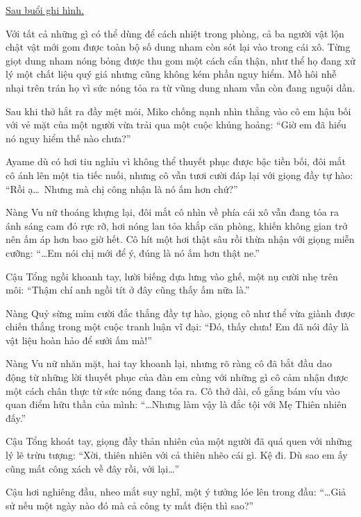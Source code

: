 \documentclass[../main.tex]{subfiles}
\begin{document}
\omk

\begin{center}
  \uline{Sau buổi ghi hình.}
\end{center}

Với tất cả những gì có thể dùng để cách nhiệt trong phòng, cả ba người vật lộn chật vật mới gom được toàn bộ số dung nham còn sót lại vào trong cái xô. Từng giọt dung nham nóng bỏng được thu gom một cách cẩn thận, như thể họ đang xử lý một chất liệu quý giá nhưng cũng không kém phần nguy hiểm. Mồ hôi nhễ nhại trên trán họ vì sức nóng tỏa ra từ vũng dung nham vẫn còn đang nguội dần.

Sau khi thở hắt ra đầy mệt mỏi, Miko chống nạnh nhìn thẳng vào cô em hậu bối với vẻ mặt của một người vừa trải qua một cuộc khủng hoảng: ``Giờ em đã hiểu nó nguy hiểm thế nào chưa?''

Ayame dù có hơi tiu nghỉu vì không thể thuyết phục được bậc tiền bối, đôi mắt cô ánh lên một tia tiếc nuối, nhưng cô vẫn tươi cười đáp lại với giọng đầy tự hào: ``Rồi ạ\dots\ Nhưng mà chị công nhận là nó ấm hơn chứ?''

Nàng Vu nữ thoáng khựng lại, đôi mắt cô nhìn về phía cái xô vẫn đang tỏa ra ánh sáng cam đỏ rực rỡ, hơi nóng lan tỏa khắp căn phòng, khiến không gian trở nên ấm áp hơn bao giờ hết. Cô hít một hơi thật sâu rồi thừa nhận với giọng miễn cưỡng: ``\dots Em nói chị mới để ý, đúng là nó ấm hơn thật ne.''

Cậu Tổng ngồi khoanh tay, lười biếng dựa lưng vào ghế, một nụ cười nhẹ trên môi: ``Thậm chí anh ngồi tít ở đây cũng thấy ấm nữa là.''

Nàng Quỷ sừng mỉm cười đắc thắng đầy tự hào, giọng cô như thể vừa giành được chiến thắng trong một cuộc tranh luận vĩ đại: ``Đó, thấy chưa! Em đã nói đây là vật liệu hoàn hảo để sưởi ấm mà!''

Nàng Vu nữ nhăn mặt, hai tay khoanh lại, nhưng rõ ràng cô đã bắt đầu dao động từ những lời thuyết phục của đàn em cùng với những gì cô cảm nhận được một cách chân thực từ sức nóng đang tỏa ra. Cô thở dài, cố gắng bám víu vào quan điểm hữu thần của mình: ``\dots Nhưng làm vậy là đắc tội với Mẹ Thiên nhiên đấy.''

Cậu Tổng khoát tay, giọng đầy thản nhiên của một người đã quá quen với những lý lẽ trừu tượng: ``Xời, thiên nhiên với cả thiên nhẽo cái gì. Kệ đi. Dù sao em ấy cũng mất công xách về đây rồi, với lại\dots''

Cậu hơi nghiêng đầu, nheo mắt suy nghĩ, một ý tưởng lóe lên trong đầu: ``\dots Giả sử nếu một ngày nào đó mà cả công ty mất điện thì sao?''
\end{document}
